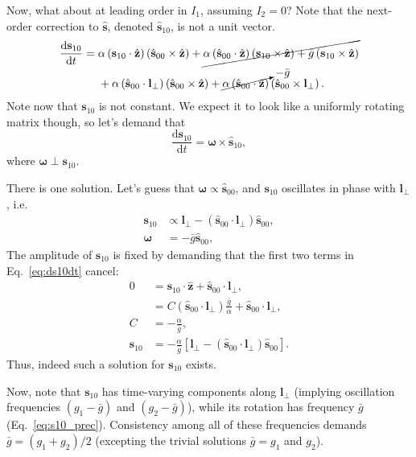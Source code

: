 \documentclass[12pt]{article}
\newcommand*{\rd}[2]{\frac{\mathrm{d}#1}{\mathrm{d}#2}}
\newcommand*{\bm}[1]{\boldsymbol{\mathbf{#1}}}
\newcommand*{\uv}[1]{\hat{\bm{#1}}}
\newcommand*{\p}[1]{\left(#1\right)}
\newcommand*{\s}[1]{\left[#1\right]}
\begin{document}
Now, what about at leading order in $I_1$, assuming $I_2 = 0$?
Note that the next-order correction to $\uv{s}$, denoted $\uv{s}_{10}$, is not a
unit vector.
\begin{align}
    \rd{\bm{s}_{10}}{t}
        ={}&
            \alpha
                \p{\bm{s}_{10} \cdot \uv{z}}
                \p{\uv{s}_{00} \times \uv{z}}
            + \cancel{\alpha
                \p{\uv{s}_{00} \cdot \uv{z}}
                \p{\bm{s}_{10} \times \uv{z}}
            + \bar{g}\p{\bm{s}_{10} \times \uv{z}}}\nonumber\\
        &+ \alpha
                \p{\uv{s}_{00} \cdot \bm{l}_{\perp}}
                \p{\uv{s}_{00} \times \uv{z}}
            + \cancelto{-\bar{g}}{\alpha
                \p{\uv{s}_{00} \cdot \uv{z}}}
                \p{\uv{s}_{00} \times \bm{l}_{\perp}}.\label{eq:ds10dt}
\end{align}
Note now that $\bm{s}_{10}$ is not constant.
We expect it to look like a uniformly rotating matrix though, so let's demand
that
\begin{equation}
    \rd{\bm{s}_{10}}{t} = \bm{\omega} \times \uv{s}_{10},
\end{equation}
where $\bm{\omega} \perp \bm{s}_{10}$.

There is one solution.
Let's guess that $\bm{\omega} \propto \uv{s}_{00}$, and $\bm{s}_{10}$ oscillates
in phase with $\bm{l}_{\perp}$, i.e.\
\begin{align}
    \bm{s}_{10} &\propto \bm{l}_{\perp} - \p{\uv{s}_{00} \cdot \bm{l}_{\perp}}
        \uv{s}_{00},\\
    \bm{\omega} &= -\bar{g}\uv{s}_{00},\label{eq:s10_prec}
\end{align}
The amplitude of $\bm{s}_{10}$ is fixed by demanding that the first two terms in
Eq.~\eqref{eq:ds10dt} cancel:
\begin{align}
    0 &= \bm{s}_{10} \cdot \uv{z} + \uv{s}_{00} \cdot \bm{l}_{\perp},\\
        &= C\p{\uv{s}_{00} \cdot \bm{l}_{\perp}}
            \frac{\bar{g}}{\alpha}
            + \uv{s}_{00} \cdot \bm{l}_{\perp},\\
    C &= -\frac{\alpha}{\bar{g}},\\
    \bm{s}_{10}
        &= -\frac{\alpha}{\bar{g}}
            \s{\bm{l}_{\perp} - \p{\uv{s}_{00} \cdot \bm{l}_{\perp}}
        \uv{s}_{00}}.
\end{align}
Thus, indeed such a solution for $\bm{s}_{10}$ exists.

Now, note that $\bm{s}_{10}$ has time-varying components along
$\bm{l}_{\perp}$ (implying oscillation frequencies $(g_1 - \bar{g})$ and $(g_2 -
\bar{g})$), while its rotation has frequency $\bar{g}$ (Eq.~\ref{eq:s10_prec}).
Consistency among all of these frequencies demands $\bar{g} = (g_1 +
g_2) / 2$ (excepting the trivial solutions $\bar{g} = g_1$ and $g_2$).
\end{document}
